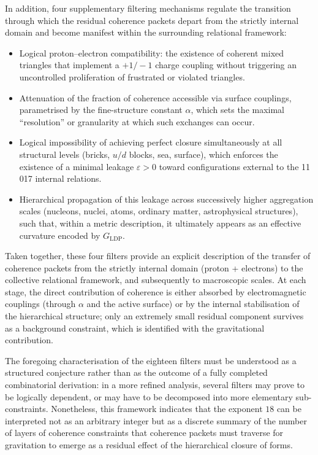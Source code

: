 \documentclass[11pt,a4paper]{article}
\begin{document}
In addition, four supplementary filtering mechanisms regulate the transition through which the residual coherence packets depart from the strictly internal domain and become manifest within the surrounding relational framework:
\begin{itemize}[label=-]
    \item Logical proton–electron compatibility: the existence of coherent mixed triangles that implement a \(+1/-1\) charge coupling without triggering an uncontrolled proliferation of frustrated or violated triangles.
    \item Attenuation of the fraction of coherence accessible via surface couplings, parametrised by the fine-structure constant \(\alpha\), which sets the maximal “resolution” or granularity at which such exchanges can occur.
    \item Logical impossibility of achieving perfect closure simultaneously at all structural levels (bricks, \(u/d\) blocks, sea, surface), which enforces the existence of a minimal leakage \(\varepsilon > 0\) toward configurations external to the 11\,017 internal relations.
    \item Hierarchical propagation of this leakage across successively higher aggregation scales (nucleons, nuclei, atoms, ordinary matter, astrophysical structures), such that, within a metric description, it ultimately appears as an effective curvature encoded by \(G_{\mathrm{LDP}}\).
\end{itemize}

Taken together, these four filters provide an explicit description of the transfer of coherence packets from the strictly internal domain (proton + electrons) to the collective relational framework, and subsequently to macroscopic scales. At each stage, the direct contribution of coherence is either absorbed by electromagnetic couplings (through \(\alpha\) and the active surface) or by the internal stabilisation of the hierarchical structure; only an extremely small residual component survives as a background constraint, which is identified with the gravitational contribution.

The foregoing characterisation of the eighteen filters must be understood as a structured conjecture rather than as the outcome of a fully completed combinatorial derivation: in a more refined analysis, several filters may prove to be logically dependent, or may have to be decomposed into more elementary sub-constraints. Nonetheless, this framework indicates that the exponent \(18\) can be interpreted not as an arbitrary integer but as a discrete summary of the number of layers of coherence constraints that coherence packets must traverse for gravitation to emerge as a residual effect of the hierarchical closure of forms.
\end{document}
